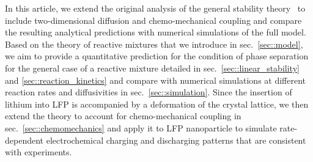 \documentclass[reprint,aps,pre,superscriptaddress]{revtex4-2}
\begin{document}
In this article, we extend the original analysis of the general stability theory~\cite{Bazant2017} to include two-dimensional diffusion and chemo-mechanical coupling and compare the resulting analytical predictions with numerical simulations of the full model.
Based on the theory of reactive mixtures that we introduce in sec.~\ref{sec::model}, we aim to provide a quantitative prediction for the condition of phase separation for the general case of a reactive mixture detailed in sec.~\ref{sec::linear_stability} and \ref{sec::reaction_kinetics} and compare with numerical simulations at different reaction rates and diffusivities in sec.~\ref{sec::simulation}. 
Since the insertion of lithium into LFP is accompanied by a deformation of the crystal lattice, we then extend the theory to account for chemo-mechanical coupling in sec.~\ref{sec::chemomechanics} and apply it to LFP nanoparticle to simulate rate-dependent electrochemical charging and discharging patterns that are consistent with experiments.





\end{document}
